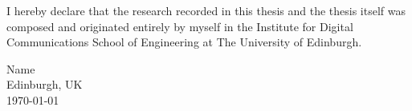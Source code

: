 

I hereby declare that the research recorded in this thesis and the
thesis itself was composed and originated entirely by myself in the
Institute for Digital Communications School of Engineering at The University
of Edinburgh.


\vspace{2.5in}

Name\\
Edinburgh, UK\\
\today

